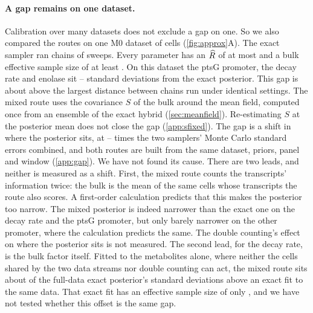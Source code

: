 \paragraph{A gap remains on one dataset.} Calibration over many datasets does not exclude a
gap on one. So we also compared the routes on one M0 dataset of  cells
(\cref{fig:approx}A). The exact sampler ran  chains of 
sweeps. Every parameter has an $\widehat{R}$ of at most
 and a bulk effective sample size of at least . On this dataset the
ptsG promoter, the decay rate and enolase sit -- standard
deviations from the exact posterior. This gap is about  above the largest
distance between chains run under identical settings. The mixed route uses the covariance $S$
of the bulk around the mean field, computed once from an ensemble of the exact hybrid
(\cref{sec:meanfield}). Re-estimating $S$ at the posterior mean does not
close the gap (\cref{app:sfixed}). The gap is a shift in where the posterior sits, at
-- times the two samplers' Monte Carlo standard errors combined, and
both routes are built from the same dataset, priors, panel and window (\cref{app:gap}). We have not found its cause. There
are two leads, and neither is measured as a shift. First, the mixed route counts the
transcripts' information twice: the bulk is the mean of the same cells whose transcripts the
route also scores. A first-order calculation predicts that this makes the posterior too narrow. The mixed
posterior is indeed narrower than the exact one on the decay rate and the ptsG promoter, but
only barely narrower on the other promoter, where the calculation predicts the same. The double
counting's effect on where the posterior sits is not measured. The second lead, for the decay
rate, is the bulk factor itself. Fitted to the metabolites alone, where neither the cells shared by the two data streams nor double
counting can act, the mixed route sits about  of the full-data exact posterior's
standard deviations above an exact fit to the same data. That exact fit has an effective sample size
of only , and we have not tested whether this offset is the same gap.


